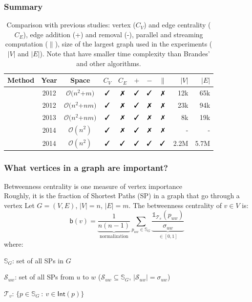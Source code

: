\documentclass[aspectratio=169]{beamer}
\newcommand{\cmark}{\text{\ding{51}}}%
\newcommand{\xmark}{\text{\ding{55}}}%
\newcommand*{\betw}{\ensuremath{\mathsf{b}}\xspace}
\begin{document}
\begin{frame}
  \frametitle{Summary}
  
  \begin{table}[t!]
    \vspace{-3mm}
    \caption{Comparison with previous studies:  vertex ($C_V$) and edge centrality  ($C_E$), edge addition (+) and removal (-), parallel and streaming computation ($\|$), size of the largest graph used in the experiments ($|V|$ and $|E|$).
    Note that \citet{NasrePR14} have smaller time complexity than Brandes' and other algorithms.}
    \centering
    \small
    \tabcolsep=0.06cm
    \begin{tabular}{ccccccccrr}
    \toprule
    Method							& Year 	&	Space				&	$C_V$	&	$C_E$	&	$+$	&	$-$	&	$\|$	&	$|V|$ & $|E|$	\\
    \midrule
    \citet{LeeLPCC12} 					& 2012	&	$\mathcal{O}(n^2$+$m)$	&	$\cmark$	&	$\xmark$	&	$\cmark$	&	$\cmark$	&	$\xmark$		&	12k	&	65k 		\\
    \citet{GreenMB12}		& 2012 	&	$\mathcal{O}(n^2$+$nm)$	&	$\cmark$	&	$\xmark$	&	$\cmark$	&	$\xmark$	&	$\xmark$		&	23k	&	94k		\\
    \citet{KasWCC13}				& 2013	&	$\mathcal{O}(n^2$+$nm)$	&	$\cmark$	&	$\xmark$	&	$\cmark$	&	$\xmark$	&	$\xmark$		&	8k	&	19k		\\
    \citet{NasrePR14}				& 2014	&	$\mathcal{O}(n^2)$	&	$\cmark$	&	$\xmark$	&	$\cmark$	&	$\xmark$	&	$\xmark$		&	-	&	-		\\
    \citet{KourtellisMB15}							& 2014	&	$\mathcal{O}(n^2)$		&	$\cmark$	&	$\cmark$	&	$\cmark$	&	$\cmark$	&	$\cmark$		&	2.2M	&	5.7M		\\
    \bottomrule
    \end{tabular}
    \label{tab:rel-work}
  \end{table}
\end{frame}




\begin{frame}
  \frametitle{What vertices in a graph are important?}
  Betweenness centrality is one measure of vertex importance\\
  \quad Roughly, it is the fraction of Shortest Paths (SP) in a graph that go through a vertex
  \vfill
  Let $G=(V,E)$, $|V|=n$, $|E|=m$. The betweenness centrality of $v\in V$ is:
  \[
    \betw(v)=\underbrace{\frac{1}{n(n-1)}}_{\mbox{normalization}}\sum_{p_{uw}\in\mathbb{S}_G}
    \underbrace{\frac{\mathds{1}_{\mathcal{T}_v}(p_{uw})}{\sigma_{uw}}}_{\in [0,1]}
  \]
  where:
  \begin{itemize*}
    \item $\mathbb{S}_G$: set of all SPs in $G$
    \item $\mathcal{S}_{uw}$: set of all SPs from $u$ to $w$
      ($\mathcal{S}_{uw}\subseteq\mathbb{S}_G$,
      $|\mathcal{S}_{uw}|=\sigma_{uw}$)
    \item $\mathcal{T}_v$: $\{p\in\mathbb{S}_G ~:~ v\in\mathsf{Int}(p)\}$
  \end{itemize*}
\end{frame}
\end{document}
